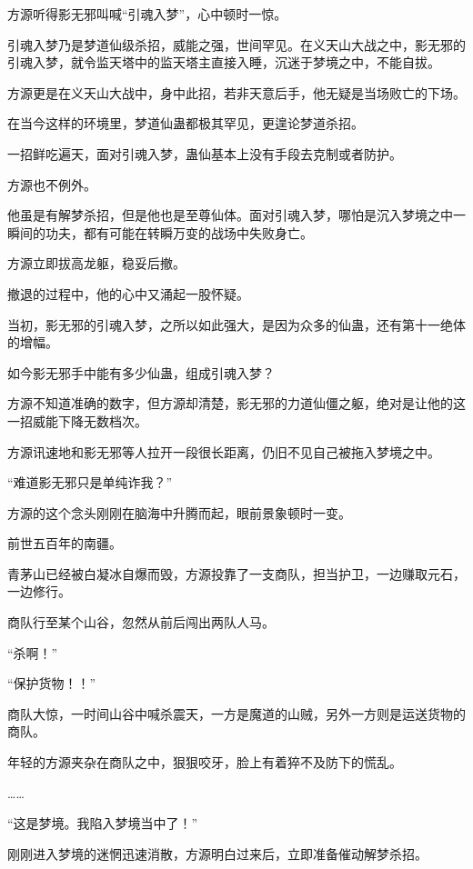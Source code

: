 
\begin{this_body}

方源听得影无邪叫喊“引魂入梦”，心中顿时一惊。

引魂入梦乃是梦道仙级杀招，威能之强，世间罕见。在义天山大战之中，影无邪的引魂入梦，就令监天塔中的监天塔主直接入睡，沉迷于梦境之中，不能自拔。

方源更是在义天山大战中，身中此招，若非天意后手，他无疑是当场败亡的下场。

在当今这样的环境里，梦道仙蛊都极其罕见，更遑论梦道杀招。

一招鲜吃遍天，面对引魂入梦，蛊仙基本上没有手段去克制或者防护。

方源也不例外。

他虽是有解梦杀招，但是他也是至尊仙体。面对引魂入梦，哪怕是沉入梦境之中一瞬间的功夫，都有可能在转瞬万变的战场中失败身亡。

方源立即拔高龙躯，稳妥后撤。

撤退的过程中，他的心中又涌起一股怀疑。

当初，影无邪的引魂入梦，之所以如此强大，是因为众多的仙蛊，还有第十一绝体的增幅。

如今影无邪手中能有多少仙蛊，组成引魂入梦？

方源不知道准确的数字，但方源却清楚，影无邪的力道仙僵之躯，绝对是让他的这一招威能下降无数档次。

方源讯速地和影无邪等人拉开一段很长距离，仍旧不见自己被拖入梦境之中。

“难道影无邪只是单纯诈我？”

方源的这个念头刚刚在脑海中升腾而起，眼前景象顿时一变。

前世五百年的南疆。

青茅山已经被白凝冰自爆而毁，方源投靠了一支商队，担当护卫，一边赚取元石，一边修行。

商队行至某个山谷，忽然从前后闯出两队人马。

“杀啊！”

“保护货物！！”

商队大惊，一时间山谷中喊杀震天，一方是魔道的山贼，另外一方则是运送货物的商队。

年轻的方源夹杂在商队之中，狠狠咬牙，脸上有着猝不及防下的慌乱。

……

“这是梦境。我陷入梦境当中了！”

刚刚进入梦境的迷惘迅速消散，方源明白过来后，立即准备催动解梦杀招。


\end{this_body}
